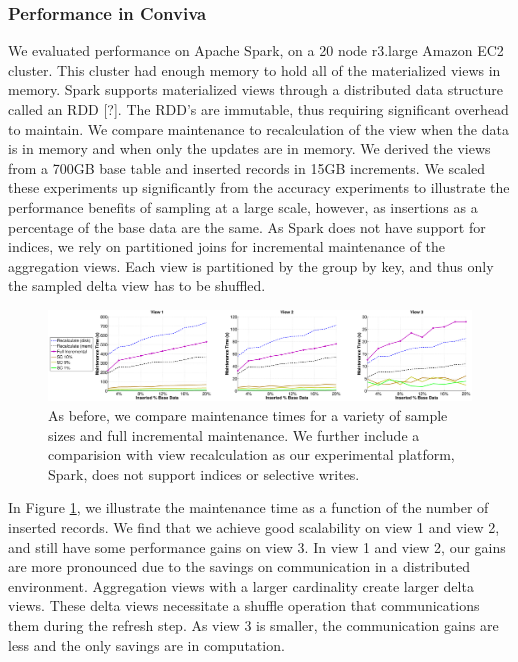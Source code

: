 \subsubsection{Performance in Conviva}
We evaluated performance on Apache Spark, on a 20 node r3.large Amazon EC2 cluster. 
This cluster had enough memory to hold all of the materialized views in memory.
Spark supports materialized views through a distributed data structure called an RDD [?].
The RDD's are immutable, thus requiring significant overhead to maintain.
We compare maintenance to recalculation of the view when the data is in memory and when only the updates are in memory. 
We derived the views from a 700GB base table and inserted records in 15GB increments. 
We scaled these experiments up significantly from the accuracy experiments to illustrate the performance benefits of sampling at a large scale, however, as insertions as a percentage of the base data are the same.
As Spark does not have support for indices, we rely on partitioned joins for incremental maintenance of the aggregation views.
Each view is partitioned by the group by key, and thus only the sampled delta view has to be shuffled. 

\begin{figure}[ht!]
\label{exp6conviva}
\hspace{-1em}
\includegraphics[scale=0.18]{exp/exp5-efficiency-conviva-woutlier.eps}
 \caption{As before, we compare maintenance times for a variety of sample sizes and full incremental maintenance. We further include a comparision with view recalculation as our experimental platform, Spark, does not support indices or selective writes.}
\end{figure}

In Figure \ref{exp6conviva}, we illustrate the maintenance time as a function of the number of inserted records.
We find that we achieve good scalability on view 1 and view 2, and still have some performance gains on view 3.
In view 1 and view 2, our gains are more pronounced due to the savings on communication in a distributed environment.
Aggregation views with a larger cardinality create larger delta views.
These delta views necessitate a shuffle operation that communications them during the refresh step.
As view 3 is smaller, the communication gains are less and the only savings are in computation.



